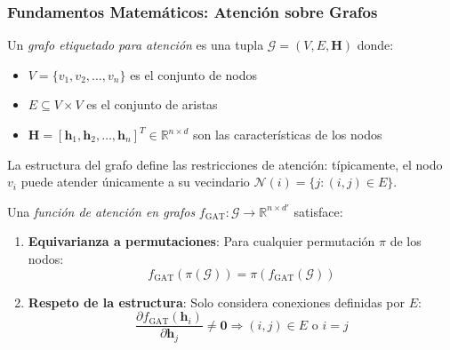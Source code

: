 \subsubsection{Fundamentos Matemáticos: Atención sobre Grafos}\label{subsubsec:fundamentos_atencion_grafos}

\begin{definition}\label{def:labeled_graph_attention}
Un \textit{grafo etiquetado para atención} es una tupla $\mathcal{G} = (V, E, \mathbf{H})$ donde:
\begin{itemize}
    \item $V = \{v_1, v_2, \ldots, v_n\}$ es el conjunto de nodos
    \item $E \subseteq V \times V$ es el conjunto de aristas
    \item $\mathbf{H} = [\mathbf{h}_1, \mathbf{h}_2, \ldots, \mathbf{h}_n]^T \in \mathbb{R}^{n \times d}$ son las características de los nodos
\end{itemize}
La estructura del grafo define las restricciones de atención: típicamente, el nodo $v_i$ puede atender únicamente a su vecindario $\mathcal{N}(i) = \{j : (i,j) \in E\}$.
\end{definition}

\begin{definition}\label{def:graph_attention_function}
Una \textit{función de atención en grafos} $f_{\text{GAT}}: \mathcal{G} \to \mathbb{R}^{n \times d'}$ satisface:
\begin{enumerate}
    \item \textbf{Equivarianza a permutaciones}: Para cualquier permutación $\pi$ de los nodos:
    \begin{equation}
        f_{\text{GAT}}(\pi(\mathcal{G})) = \pi(f_{\text{GAT}}(\mathcal{G}))
        \label{eq:gat_permutation_equivariance}
    \end{equation}

    \item \textbf{Respeto de la estructura}: Solo considera conexiones definidas por $E$:
    \begin{equation}
        \frac{\partial f_{\text{GAT}}(\mathbf{h}_i)}{\partial \mathbf{h}_j} \neq \mathbf{0} \Rightarrow (i,j) \in E \text{ o } i = j
        \label{eq:gat_structural_constraint}
    \end{equation}
\end{enumerate}
\end{definition}

